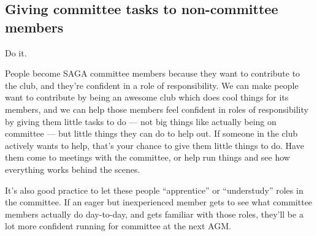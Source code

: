 \subsection{Giving committee tasks to non-committee members}

Do it.

People become SAGA committee members because they want to contribute to the club, and they're confident in a role of responsibility. We can make people want to contribute by being an awesome club which does cool things for its members, and we can help those members feel confident in roles of responsibility by giving them little tasks to do --- not big things like actually being on committee --- but little things they can do to help out. If someone in the club actively wants to help, that's your chance to give them little things to do. Have them come to meetings with the committee, or help run things and see how everything works behind the scenes.

It's also good practice to let these people ``apprentice'' or ``understudy'' roles in the committee. If an eager but inexperienced member gets to see what committee members actually do day-to-day, and gets familiar with those roles, they'll be a lot more confident running for committee at the next AGM.